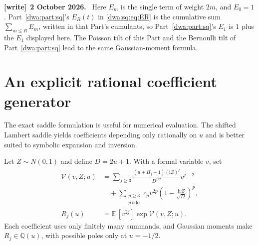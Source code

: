 \documentclass[11pt,letterpaper]{article}
\numberwithin{equation}{section}
\theoremstyle{remark}
\newcommand{\ii}{\mathrm i}
\newcommand{\E}{\mathbb E}
\newenvironment{writenote}[1][]{\par\smallskip\begingroup\small
 \noindent\textbf{[write]}\if\relax\detokenize{#1}\relax\else~\textbf{#1.}\fi\ }%
 {\par\endgroup\smallskip}
\begin{document}
\begin{writenote}[2 October 2026]
Here $E_m$ is the single term of weight $2m$, and $E_0=1$. Part~\ref{dwa:part:sq}'s $E_R(t)$ in \eqref{dwa:sq:eq:ER} is the cumulative sum $\sum_{m\le R}E_m$, written in that Part's cumulants, so Part~\ref{dwa:part:sq}'s $E_1$ is $1$ plus the $E_1$ displayed here. The Poisson tilt of this Part and the Bernoulli tilt of Part~\ref{dwa:part:sq} lead to the same Gaussian-moment formula.
\end{writenote}

\section{An explicit rational coefficient generator}
The exact saddle formulation is useful for numerical evaluation. The shifted Lambert saddle yields coefficients depending only rationally on $u$ and is better suited to symbolic expansion and inversion.

Let $Z\sim N(0,1)$ and define $D=2u+1$. With a formal variable $v$, set
\begin{align}\label{dwa:as:eq:generator}
 \mathcal V(v,Z;u)
 &=\sum_{j\ge3}\frac{(u+H_j-1)(\ii Z)^j}{D^{j/2}}v^{j-2}\nonumber\\
 &\quad+\sum_{\substack{p\ge3\\p\ \mathrm{odd}}}
 c_pv^{2p}\left(1-\frac{\ii vZ}{\sqrt D}\right)^p,\\
 R_j(u)&=\E\,[v^{2j}]\exp\mathcal V(v,Z;u).\label{dwa:as:eq:Rdef}
\end{align}
Each coefficient uses only finitely many summands, and Gaussian moments make $R_j\in\mathbb Q(u)$, with possible poles only at $u=-1/2$.
\end{document}
